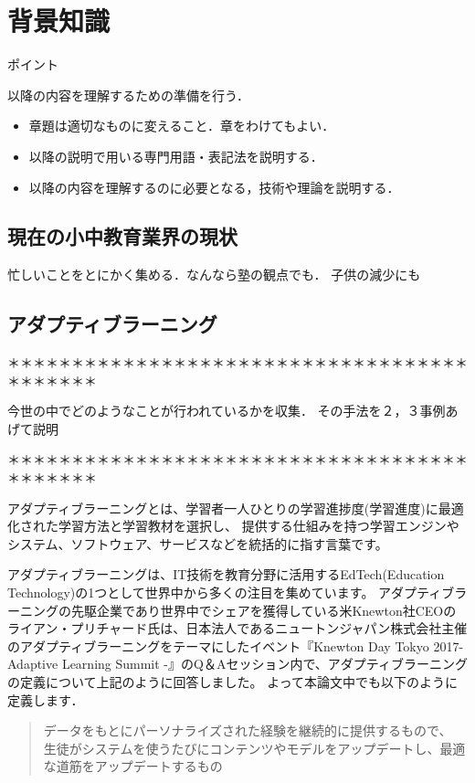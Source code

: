 \documentclass[a4j,11pt,report]{jsbook}
\newcommand{\point}[1]{
\begin{itembox}[l]{ポイント}
  #1
\end{itembox}
}
\begin{document}
\chapter{背景知識\label{ch:background}}

\point{
以降の内容を理解するための準備を行う．
\begin{itemize}
  \item 章題は適切なものに変えること．章をわけてもよい．
  \item 以降の説明で用いる専門用語・表記法を説明する．
  \item 以降の内容を理解するのに必要となる，技術や理論を説明する．
\end{itemize}
}
\section{現在の小中教育業界の現状}
忙しいことをとにかく集める．なんなら塾の観点でも．
子供の減少にも

\section{アダプティブラーニング}

＊＊＊＊＊＊＊＊＊＊＊＊＊＊＊＊＊＊＊＊＊＊＊＊＊＊＊＊＊＊＊＊＊＊＊＊＊＊＊＊＊＊＊

今世の中でどのようなことが行われているかを収集．
その手法を２，３事例あげて説明

＊＊＊＊＊＊＊＊＊＊＊＊＊＊＊＊＊＊＊＊＊＊＊＊＊＊＊＊＊＊＊＊＊＊＊＊＊＊＊＊＊＊＊

アダプティブラーニングとは、学習者一人ひとりの学習進捗度(学習進度)に最適化された学習方法と学習教材を選択し、
提供する仕組みを持つ学習エンジンやシステム、ソフトウェア、サービスなどを統括的に指す言葉です。

アダプティブラーニングは、IT技術を教育分野に活用するEdTech(Education Technology)の1つとして世界中から多くの注目を集めています。
アダプティブラーニングの先駆企業であり世界中でシェアを獲得している米Knewton社CEOのライアン・プリチャード氏は、日本法人であるニュートンジャパン株式会社主催のアダプティブラーニングをテーマにしたイベント『Knewton Day Tokyo 2017- Adaptive Learning Summit -』のQ＆Aセッション内で、アダプティブラーニングの定義について上記のように回答しました。
よって本論文中でも以下のように定義します．
\begin{quote}
  データをもとにパーソナライズされた経験を継続的に提供するもので、
  生徒がシステムを使うたびにコンテンツやモデルをアップデートし、最適な道筋をアップデートするもの
\end{quote}
\end{document}
